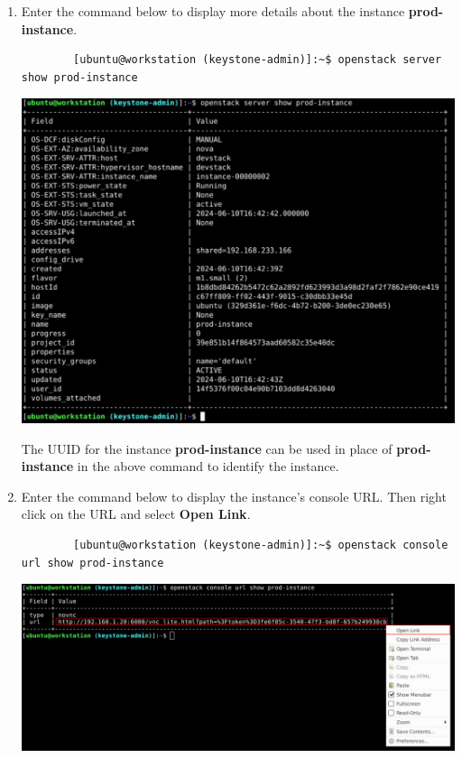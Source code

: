 \documentclass[letterpaper, 12pt]{article}
\begin{document}
\begin{enumerate}
    \item Enter the command below to display more details about the instance \textbf{prod-instance}.
    \begin{lstlisting}
        [ubuntu@workstation (keystone-admin)]:~$ openstack server show prod-instance
    \end{lstlisting}

    \begin{center}
        \includegraphics[width=\linewidth]{images/part2/step15.png}
    \end{center}

    \begin{tipbox}
        The UUID for the instance \textbf{prod-instance} can be used in place of \textbf{prod-instance} in the above
        command to identify the instance.
    \end{tipbox}

    \item Enter the command below to display the instance's console URL. Then right click on the URL and select
    \textbf{Open Link}.
    \begin{lstlisting}
        [ubuntu@workstation (keystone-admin)]:~$ openstack console url show prod-instance
    \end{lstlisting}

    \begin{center}
        \includegraphics[width=\linewidth]{images/part2/step16.png}
    \end{center}


\end{enumerate}
\end{document}
